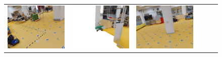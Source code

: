 \documentclass[twoside]{ctuthesis}
\theoremstyle{plain}
\theoremstyle{definition}
\theoremstyle{note}
\begin{document}
{\begin{figure}
{\begin{tabular}{c|c|c|c|c|c}
    \includegraphics[width=\thiswidth]{evaluation/queryPipeline/38.jpg/synthesized} & 
    \includegraphics[width=\thiswidth]{evaluation/queryPipeline/16.jpg/synthesized} & 
    \includegraphics[width=\thiswidth]{evaluation/queryPipeline/26.jpg/synthesized} \\[-1pt]

\end{tabular}}
\end{figure}}
\end{document}
